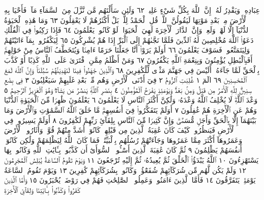 عِبَادِهِۦ وَيَقْدِرُ لَهُۥٓۚ إِنَّ ٱللَّهَ بِكُلِّ شَيْءٍ عَلِيمࣱ ٦٢ وَلَئِن سَأَلْتَهُم
مَّن نَّزَّلَ مِنَ ٱلسَّمَآءِ مَآءࣰ فَأَحْيَا بِهِ ٱلْأَرْضَ مِنۢ بَعْدِ مَوْتِهَا
لَيَقُولُنَّ ٱللَّهُۚ قُلِ ٱلْحَمْدُ لِلَّهِۚ بَلْ أَكْثَرُهُمْ لَا يَعْقِلُونَ ٦٣
وَمَا هَٰذِهِ ٱلْحَيَوٰةُ ٱلدُّنْيَآ إِلَّا لَهْوࣱ وَلَعِبࣱۚ وَإِنَّ ٱلدَّارَ ٱلْأٓخِرَةَ لَهِيَ
ٱلْحَيَوَانُۚ لَوْ كَانُوا۟ يَعْلَمُونَ ٦٤ فَإِذَا رَكِبُوا۟ فِي ٱلْفُلْكِ دَعَوُا۟ ٱللَّهَ
مُخْلِصِينَ لَهُ ٱلدِّينَ فَلَمَّا نَجَّىٰهُمْ إِلَى ٱلْبَرِّ إِذَا هُمْ يُشْرِكُونَ ٦٥
لِيَكْفُرُوا۟ بِمَآ ءَاتَيْنَٰهُمْ وَلِيَتَمَتَّعُوا۟ۚ فَسَوْفَ يَعْلَمُونَ ٦٦
أَوَلَمْ يَرَوْا۟ أَنَّا جَعَلْنَا حَرَمًا ءَامِنࣰا وَيُتَخَطَّفُ ٱلنَّاسُ مِنْ
حَوْلِهِمْۚ أَفَبِٱلْبَٰطِلِ يُؤْمِنُونَ وَبِنِعْمَةِ ٱللَّهِ يَكْفُرُونَ ٦٧
وَمَنْ أَظْلَمُ مِمَّنِ ٱفْتَرَىٰ عَلَى ٱللَّهِ كَذِبًا أَوْ كَذَّبَ بِٱلْحَقِّ لَمَّا جَآءَهُۥٓۚ
أَلَيْسَ فِي جَهَنَّمَ مَثْوࣰى لِّلْكَٰفِرِينَ ٦٨ وَٱلَّذِينَ جَٰهَدُوا۟
فِينَا لَنَهْدِيَنَّهُمْ سُبُلَنَاۚ وَإِنَّ ٱللَّهَ لَمَعَ ٱلْمُحْسِنِينَ ٦٩
الٓمٓ ١ غُلِبَتِ ٱلرُّومُ ٢ فِيٓ أَدْنَى ٱلْأَرْضِ وَهُم مِّنۢ
بَعْدِ غَلَبِهِمْ سَيَغْلِبُونَ ٣ فِي بِضْعِ سِنِينَۗ لِلَّهِ ٱلْأَمْرُ
مِن قَبْلُ وَمِنۢ بَعْدُۚ وَيَوْمَئِذࣲ يَفْرَحُ ٱلْمُؤْمِنُونَ ٤
بِنَصْرِ ٱللَّهِۚ يَنصُرُ مَن يَشَآءُۖ وَهُوَ ٱلْعَزِيزُ ٱلرَّحِيمُ ٥
وَعْدَ ٱللَّهِۖ لَا يُخْلِفُ ٱللَّهُ وَعْدَهُۥ وَلَٰكِنَّ أَكْثَرَ ٱلنَّاسِ لَا يَعْلَمُونَ ٦
يَعْلَمُونَ ظَٰهِرࣰا مِّنَ ٱلْحَيَوٰةِ ٱلدُّنْيَا وَهُمْ عَنِ ٱلْأٓخِرَةِ هُمْ
غَٰفِلُونَ ٧ أَوَلَمْ يَتَفَكَّرُوا۟ فِيٓ أَنفُسِهِمۗ مَّا خَلَقَ ٱللَّهُ ٱلسَّمَٰوَٰتِ
وَٱلْأَرْضَ وَمَا بَيْنَهُمَآ إِلَّا بِٱلْحَقِّ وَأَجَلࣲ مُّسَمࣰّىۗ وَإِنَّ كَثِيرࣰا
مِّنَ ٱلنَّاسِ بِلِقَآئِ رَبِّهِمْ لَكَٰفِرُونَ ٨ أَوَلَمْ يَسِيرُوا۟ فِي
ٱلْأَرْضِ فَيَنظُرُوا۟ كَيْفَ كَانَ عَٰقِبَةُ ٱلَّذِينَ مِن قَبْلِهِمْۚ كَانُوٓا۟
أَشَدَّ مِنْهُمْ قُوَّةࣰ وَأَثَارُوا۟ ٱلْأَرْضَ وَعَمَرُوهَآ أَكْثَرَ مِمَّا
عَمَرُوهَا وَجَآءَتْهُمْ رُسُلُهُم بِٱلْبَيِّنَٰتِۖ فَمَا كَانَ ٱللَّهُ
لِيَظْلِمَهُمْ وَلَٰكِن كَانُوٓا۟ أَنفُسَهُمْ يَظْلِمُونَ ٩ ثُمَّ كَانَ
عَٰقِبَةَ ٱلَّذِينَ أَسَٰٓـُٔوا۟ ٱلسُّوٓأَىٰٓ أَن كَذَّبُوا۟ بِـَٔايَٰتِ ٱللَّهِ وَكَانُوا۟ بِهَا
يَسْتَهْزِءُونَ ١٠ ٱللَّهُ يَبْدَؤُا۟ ٱلْخَلْقَ ثُمَّ يُعِيدُهُۥ ثُمَّ إِلَيْهِ تُرْجَعُونَ ١١
وَيَوْمَ تَقُومُ ٱلسَّاعَةُ يُبْلِسُ ٱلْمُجْرِمُونَ ١٢ وَلَمْ يَكُن لَّهُم مِّن
شُرَكَآئِهِمْ شُفَعَٰٓؤُا۟ وَكَانُوا۟ بِشُرَكَآئِهِمْ كَٰفِرِينَ ١٣
وَيَوْمَ تَقُومُ ٱلسَّاعَةُ يَوْمَئِذࣲ يَتَفَرَّقُونَ ١٤ فَأَمَّا ٱلَّذِينَ
ءَامَنُوا۟ وَعَمِلُوا۟ ٱلصَّٰلِحَٰتِ فَهُمْ فِي رَوْضَةࣲ يُحْبَرُونَ ١٥
وَأَمَّا ٱلَّذِينَ كَفَرُوا۟ وَكَذَّبُوا۟ بِـَٔايَٰتِنَا وَلِقَآئِ ٱلْأٓخِرَةِ
